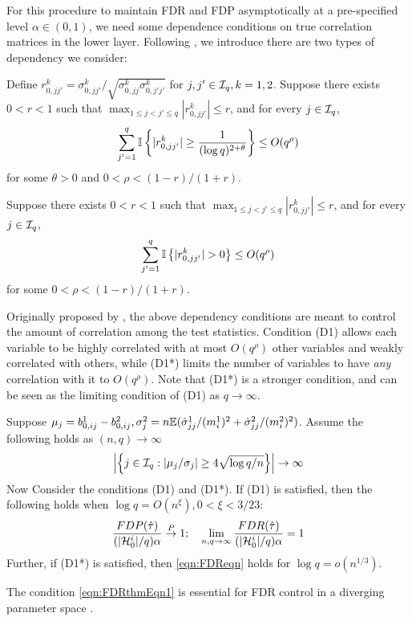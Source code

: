 For this procedure to maintain FDR and FDP asymptotically at a pre-specified level $\alpha \in (0,1)$, we need some dependence conditions on true correlation matrices in the lower layer. Following \cite{LiuShao14}, we introduce there are two types of dependency we consider:

 Define $r_{0,jj'}^k = \sigma_{0,jj'}^k /\sqrt{\sigma_{0,jj}^k \sigma_{0,j'j'}^k}$ for $j,j' \in {\cal{I}}_q, k = 1,2$. Suppose there exists $0 < r < 1$ such that $\max_{1 \leq j < j' \leq q} | r_{0,jj'}^k | \leq r$, and for every $j \in {\cal{I}}_q$,
%
$$
\sum_{j'=1}^q {\mathbb{I}} \left\{ |r_{0,jj'}^k| \geq \frac{1}{(\log q)^{2 + \theta}} \right\} \leq O(q^\rho)
$$
%
for some $\theta > 0$ and $0 < \rho < (1-r)/(1+r)$.

 Suppose there exists $0 < r < 1$ such that $\max_{1 \leq j < j' \leq q} | r_{0,jj'}^k | \leq r$, and for every $j \in {\cal{I}}_q$,
%
$$
\sum_{j'=1}^q {\mathbb{I}} \left\{ |r_{0,jj'}^k| > 0 \right\} \leq O(q^\rho)
$$
%
for some $0 < \rho < (1-r)/(1+r)$.

Originally proposed by \cite{LiuShao14}, the above dependency conditions are meant to control the amount of correlation among the test statistics. Condition (D1) allows each variable to be highly correlated with at most $O(q^\rho)$ other variables and weakly correlated with others, while (D1*) limits the number of variables to have {\it any} correlation with it to $O(q^\rho)$. Note that (D1*) is a stronger condition, and can be seen as the limiting condition of (D1) as $q \rightarrow \infty$.

\begin{Theorem}\label{thm:FDRthm}
Suppose $\mu_j = b_{0,ij}^1 - b_{0,ij}^2, \sigma_j^2 = n {\mathbb{E}} (\hat \sigma_{jj}^1/ (m_i^1)^2 + \hat \sigma_{jj}^2/ (m_i^2)^2)$. Assume the following holds as $(n,q) \rightarrow \infty$
%
\begin{align}\label{eqn:FDRthmEqn1}
\left| \left\{ j \in {\cal{I}}_q: |\mu_j / \sigma_j | \geq
4 \sqrt{ \log q/n} \right\} \right| \rightarrow \infty
\end{align}
%
Now Consider the conditions (D1) and (D1*). If (D1) is satisfied, then the following holds when $\log q = O(n^{\xi}), 0 < \xi < 3/23$:
%
\begin{align}\label{eqn:FDReqn}
\frac{FDP( \hat \tau)}{(| {\cal{H}}_0^i|/q) \alpha} \stackrel{P}{\rightarrow} 1; \quad
\lim_{n, q \rightarrow \infty} \frac{FDR( \hat \tau)}{(| {\cal{H}}_0^i|/q) \alpha} = 1
\end{align}
%
Further, if (D1*) is satisfied, then \eqref{eqn:FDReqn} holds for $\log q = o(n^{1/3})$.
\end{Theorem}
%
The condition \eqref{eqn:FDRthmEqn1} is essential for FDR control in a diverging parameter space \citep{LiuShao14, Liu17}.

